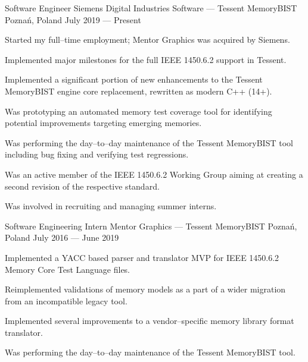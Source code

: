\documentclass[11pt, a4paper]{awesome-cv}
\begin{document}
\begin{cventries}
  \cventry
    {Software Engineer} %
    {Siemens Digital Industries Software --- Tessent MemoryBIST} %
    {Poznań, Poland} %
    {July 2019 --- Present} %
    {
      \begin{cvitems} %
      \item {Started my full--time employment; Mentor Graphics was acquired by Siemens.}
      \item {Implemented major milestones for the full IEEE 1450.6.2 support in Tessent.}
      \item {Implemented a significant portion of new enhancements to the Tessent MemoryBIST engine core replacement, rewritten as modern C++ (14+).}
      \item {Was prototyping an automated memory test coverage tool for identifying potential improvements targeting emerging memories.}
      \item {Was performing the day--to--day maintenance of the Tessent MemoryBIST tool including bug fixing and verifying test regressions.}
      \item {Was an active member of the IEEE 1450.6.2 Working Group aiming at creating a second revision of the respective standard.}
      \item {Was involved in recruiting and managing summer interns.}
      \end{cvitems}
    }

  \cventry
    {Software Engineering Intern} %
    {Mentor Graphics --- Tessent MemoryBIST} %
    {Poznań, Poland} %
    {July 2016 --- June 2019} %
    {
      \begin{cvitems} %
      \item {Implemented a YACC based parser and translator MVP for IEEE 1450.6.2 Memory Core Test Language files.}
      \item {Reimplemented validations of memory models as a part of a wider migration from an incompatible legacy tool.}
      \item {Implemented several improvements to a vendor--specific memory library format translator.}
      \item {Was performing the day--to--day maintenance of the Tessent MemoryBIST tool.}
      \end{cvitems}
    }


\end{cventries}
\end{document}
